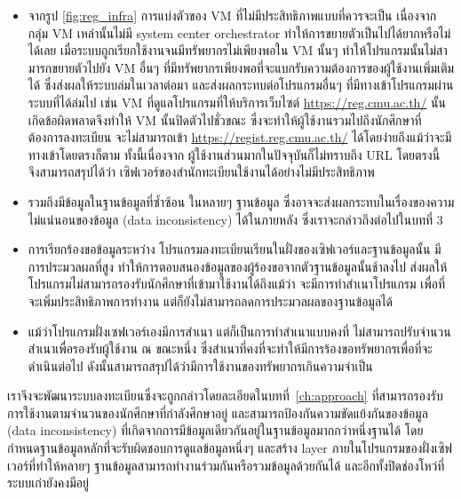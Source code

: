 \begin{itemize}
\item จากรูป \ref{fig:reg_infra} การแบ่งตัวของ VM \cite{vm} ที่ไม่มีประสิทธิภาพแบบที่ควรจะเป็น
เนื่องจากกลุ่ม VM เหล่านั้นไม่มี system center orchestrator \cite{sco} ทำให้การขยายตัวเป็นไปได้ยากหรือไม่ได้เลย เมื่อระบบถูกเรียกใช้งานจนมีทรัพยากรไม่เพียงพอใน VM นั้นๆ ทำให้โปรแกรมนั้นไม่สามารกขยายตัวไปยัง VM อื่นๆ ที่มีทรัพยากรเพียงพอที่จะแบกรับความต้องการของผู้ใช้งานเพิ่มเติมได้ ซึ่งส่งผลให้ระบบล่มในเวลาต่อมา และส่งผลกระทบต่อโปรแกรมอื่นๆ 
ที่มีทางเข้าโปรแกรมผ่านระบบที่ได้ล่มไป เช่น VM ที่ดูแลโปรแกรมที่ให้บริการเว็บไซต์ \url{https://reg.cmu.ac.th/} นั้นเกิดข้อผิดพลาดจึงทำให้ VM นั้นปิดตัวไปชั่วขณะ ซึ่งจะทำให้ผู้ใช้งานรวมไปถึงนักศึกษาที่ต้องการลงทะเบียน จะไม่สามารถเข้า \url{https://regist.reg.cmu.ac.th/} ได้โดยง่ายถึงแม้ว่าจะมีทางเข้าโดยตรงก็ตาม ทั้งนี้เนื่องจาก ผู้ใช้งานส่วนมากในปัจจุบันก็ไม่ทราบถึง URL โดยตรงนี้ จึงสามารถสรุปได้ว่า เซิฟเวอร์ของสำนักทะเบียนใช้งานได้อย่างไม่มีประสิทธิภาพ

\item รวมถึงมีข้อมูลในฐานข้อมูลที่ซ้ำซ้อน ในหลายๆ ฐานข้อมูล ซึ่งอาจจะส่งผลกระทบในเรื่องของความไม่แน่นอนของข้อมูล (data inconsistency) ได้ในภายหลัง ซึ่งเราจะกล่าวถึงต่อไปในบทที่ 3

\item การเรียกร้องขอข้อมูลระหว่าง โปรแกรมลงทะเบียนเรียนในฝั่งของเซิฟเวอร์และฐานข้อมูลนั้น มีการประมวลผลที่สูง ทำให้การตอบสนองข้อมูลของผู้ร้องขอจากตัวฐานข้อมูลนั้นช้าลงไป ส่งผลให้ โปรแกรมไม่สามารถรองรับนักศึกษาที่เข้ามาใช้งานได้ถึงแม้ว่า จะมีการทำสำเนาโปรแกรม เพื่อที่จะเพิ่มประสิทธิภาพการทำงาน แต่ก็ยังไม่สามารถลดการประมวลผลของฐานข้อมูลได้

\item แม้ว่าโปรแกรมฝั่งเซฟเวอร์เองมีการสำเนา แต่ก็เป็นการทำสำเนาแบบคงที่ ไม่สามารถปรับจำนวนสำเนาเพื่อรองรับผู้ใช้งาน ณ ขณะหนึ่ง ซึ่งสำเนาที่คงที่จะทำให้มีการร้องขอทรัพยากรเพื่อที่จะดำเนินต่อไป ดังนั้นสามารถสรุปได้ว่ามีการใช้งานของทรัพยากรเกินความจำเป็น
\end{itemize}

เราจึงจะพัฒนาระบบลงทะเบียนซึ่งจะถูกกล่าวโดยละเอียดในบทที่~\ref{ch:approach} ที่สามารถรองรับการใช้งานตามจำนวนของนักศึกษาที่กำลังศึกษาอยู่ และสามารถป้องกันความขัดแย้งกันของข้อมูล (data inconsistency) ที่เกิดจากการมีข้อมูลเดียวกันอยู่ในฐานข้อมูลมากกว่าหนึ่งฐานได้ โดยกำหนดฐานข้อมูลหลักที่จะรับผิดชอบการดูแลข้อมูลหนึ่งๆ และสร้าง layer ภายในโปรแกรมของฝั่งเซิฟเวอร์ที่ทำให้หลายๆ ฐานข้อมูลสามารถทำงานร่วมกันหรือรวมข้อมูลด้วยกันได้ และอีกทั้งปิดช่องโหว่ที่ระบบเก่ายังคงมีอยู่

